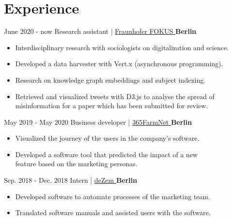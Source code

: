 \documentclass[]{commands}
\begin{document}
\section{Experience}
\begin{entrylist}
  \entry
    {June 2020 - now}
    {Research assistant | }
    { \href{https://www.fokus.fraunhofer.de/}{\small Fraunhofer FOKUS \faMousePointer}}
    {\normalsize\textbf{\color{ipsgreen}\faMapMarker\space Berlin}}
    {\jobspace
    \begin{itemize}[leftmargin=*, itemsep = 0.1em]
        \item Interdisciplinary research with sociologists on digitalization and science.
        \item Developed a data harvester with Vert.x (asynchronous programming).
        \item Research on knowledge graph embeddings and subject indexing.
        \item Retrieved and visualized tweets with D3.js to analyse the spread of \\ 
            misinformation for a paper which has been submitted for review.\\
    \end{itemize}}

  \entry
    {May 2019 - May 2020}
    {Business developer | }
    { \href{https://www.365farmnet.com/en/}{\small 365FarmNet \faMousePointer}}
    {\normalsize\textbf{\color{ipsgreen}\faMapMarker\space Berlin}}
    {\jobspace
    \begin{itemize}[leftmargin=*, itemsep = 0.1em]
        \item Visualized the journey of the users in the company's software.
        \item Developed a software tool that predicted the impact of a new \\
            feature based on the marketing personas. \\
    \end{itemize}}
    
  \entry
    {Sep. 2018 - Dec. 2018}
    {Intern | }
    { \href{https://www.dezem.de/en/}{\small deZem \faMousePointer}}
    {\normalsize\textbf{\color{ipsgreen}\faMapMarker\space Berlin}}
    {\jobspace
    \begin{itemize}[leftmargin=*, itemsep = 0.1em]
        \item Developed software to automate processes of the marketing team.
        \item Translated software manuals and assisted users with the software. \\
    \end{itemize}}
    

\end{entrylist}
\end{document}
